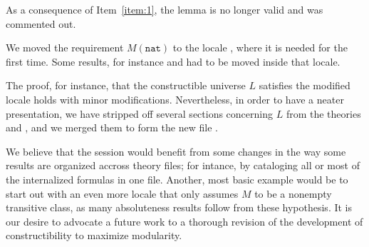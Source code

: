 As a consequence of Item~\ref{item:1}, the lemma
 is no longer valid and was commented
out.

We moved the requirement $M(\mathtt{nat})$ to the locale
, where it is needed for the first time. Some results,
for instance  and 
 had to be moved inside that
locale.

The proof, for instance, that the constructible universe $L$ satisfies
the modified locale  holds with minor
modifications. Nevertheless, in order to have a neater presentation,
we have stripped off several sections concerning $L$ from the theories
 and , and we merged them to form
the new file  . 

\medskip
{}
\medskip

We believe that the
 session  would benefit from some changes in
the way some results are organized accross theory files; for
intance, by cataloging all or most of the internalized formulas in one
file. Another, most basic example would be to start out with an even
more locale that only assumes $M$ to be a nonempty transitive class,
as many absoluteness results follow from these hypothesis.  
It is our desire to advocate a future work to a thorough
revision of the development of constructibility to maximize modularity.

